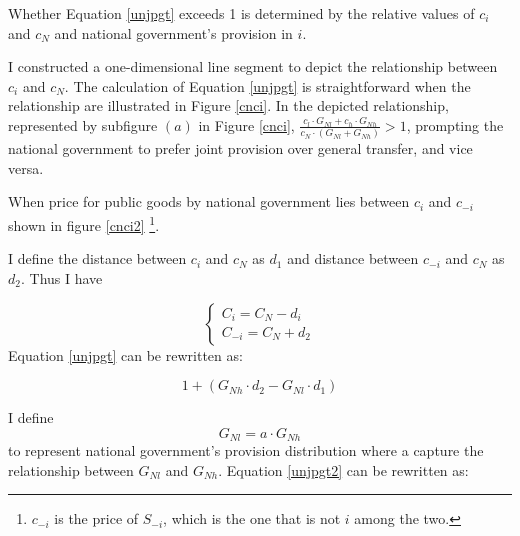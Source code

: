
Whether Equation \ref{unjpgt} exceeds 1 is determined by the relative values of $c_i$ and $c_N$ and national government's provision in $i$.

I constructed a one-dimensional line segment to depict the relationship between $c_i$ and $c_N$. The calculation of Equation \ref{unjpgt} is straightforward  when the relationship are illustrated in Figure \ref{cnci}. In the depicted relationship, represented by subfigure $(a)$ in Figure \ref{cnci}, $\frac{c_l\cdot G_{Nl}+c_h\cdot G_{Nh}}{c_N\cdot (G_{Nl}+G_{Nh})}>1$, prompting the national government to prefer joint provision over general transfer, and vice versa.


When price for public goods by national government lies between $c_i$ and $c_{-i}$ shown in figure \ref{cnci2} \footnote{$c_{-i}$ is the price of $S_{-i}$, which is the one that is not $i$ among the two. }.

I define the distance between $c_i$ and $c_N$ as $d_1$ and distance between $c_{-i}$ and $c_N$ as $d_2$. Thus I have

$$
    \left\{\begin{array}{l}
        C_i=C_N-d_i \\
        C_{-i}=C_N+d_2
    \end{array}\right.
$$
Equation \ref{unjpgt} can be rewritten as:

\begin{equation}
    1+(G_{Nh} \cdot d_2-G_{Nl} \cdot d_1) \label{unjpgt2}
\end{equation}

I define $$G_{Nl}= a \cdot G_{Nh}$$ to represent national government's provision distribution where a capture the relationship between $G_{Nl}$ and $G_{Nh}$. Equation \ref{unjpgt2} can be rewritten as:

